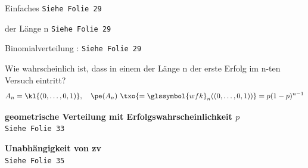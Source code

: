 \begin{bsp}
    Einfaches \bernoulli  \texttt{Siehe Folie 29}
\end{bsp}
\begin{bsp}
    \bernoulli  der Länge n \texttt{Siehe Folie 29}
\end{bsp}
\begin{bsp}
    Binomialverteilung : \texttt{Siehe Folie 29}
\end{bsp}
\begin{prob}
    Wie wahrscheinlich ist, dass in einem \bernoulli  der Länge n der erste Erfolg im n-ten Versuch eintritt?  
    \[
        A_n = \kl{(0,\dots,0,1)}, \quad \pe(A_n) \ \txo{ = \glssymbol{wfk}_n((0,\dots,0,1))} = p(1 - p)^{n-1}
    \]
\end{prob}


\begin{defi}
    \textbf{geometrische Verteilung mit Erfolgswahrscheinlichkeit $p$}   \\
    \texttt{Siehe Folie 33}
\end{defi}
\begin{defi}
    \textbf{Unabhängigkeit von \gls{zv}}   \\
    \texttt{Siehe Folie 35}
\end{defi}

\newpage
